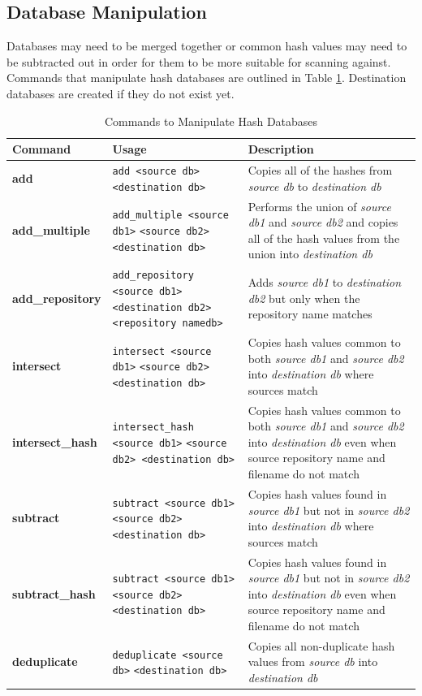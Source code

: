 \documentclass[11pt,fleqn]{article} %
\begin{document}
\subsection{Database Manipulation}
\label{DatabaseManipulation}
Databases may need to be merged together or common hash values may need to be subtracted out in order for them to be more suitable for scanning against.
Commands that manipulate hash databases are outlined in Table \ref{tab:databaseManipulation}.
Destination databases are created if they do not exist yet.

\begin{table}[!ht]
\centering
\caption{Commands to Manipulate Hash Databases}
\label{tab:databaseManipulation}
\begin{tabular}{|p{3.5 cm}|p{6 cm}|p{4 cm}|}
\hline \hline
\textbf{Command} & \textbf{Usage} & \textbf{Description} \\
\hline
\textbf{add} & \verb+add <source db>+ \verb+<destination db>+ & Copies all of the hashes from \textit{source db} to \textit{destination db}\\
\hline
\textbf{add\_multiple} &  \verb+add_multiple <source db1>+ \verb+<source db2> <destination db>+ & Performs the union of \textit{source db1} and \textit{source db2} and copies all of the hash values from the union into \textit{destination db}\\
\hline
\textbf{add\_repository} & \verb+add_repository <source db1>+ \verb+<destination db2>+ \verb+<repository namedb>+ & Adds \textit{source db1} to \textit{destination db2} but only when the repository name matches\\
\hline
\textbf{intersect} & \verb+intersect <source db1>+ \verb+<source db2> <destination db>+ &   Copies hash values common to both \textit{source db1} and \textit{source db2} into \textit{destination db} where sources match\\
\hline
\textbf{intersect\_hash} & \verb+intersect_hash <source db1>+ \verb+<source db2> <destination db>+ &   Copies hash values common to both \textit{source db1} and \textit{source db2} into \textit{destination db} even when source repository name and filename do not match\\
\hline
\textbf{subtract} & \verb+subtract <source db1>+ \verb+<source db2> <destination db>+&   Copies hash values found in \textit{source db1} but not in \textit{source db2} into \textit{destination db} where sources match\\
\hline
\textbf{subtract\_hash} & \verb+subtract <source db1>+ \verb+<source db2> <destination db>+&   Copies hash values found in \textit{source db1} but not in \textit{source db2} into \textit{destination db} even when source repository name and filename do not match\\
\hline
\textbf{deduplicate} & \verb+deduplicate <source db>+ \verb+<destination db>+ &   Copies all non-duplicate hash values from \textit{source db} into \textit{destination db}\\
\hline
\end{tabular}
\end{table}
\end{document}
